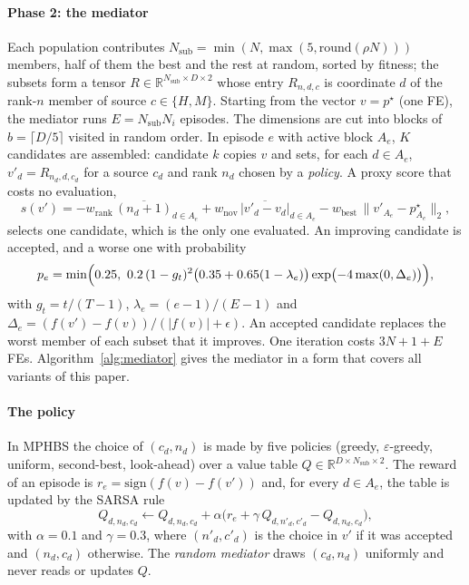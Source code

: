 \paragraph{Phase 2: the mediator} Each population contributes $N_\mathrm{sub}=\min(N,\max(5,\mathrm{round}(\rho N)))$
members, half of them the best and the rest at random, sorted by fitness; the subsets form a tensor
$R\in\mathbb{R}^{N_\mathrm{sub}\times D\times 2}$ whose entry $R_{n,d,c}$ is coordinate $d$ of the rank-$n$ member of source
$c\in\{H,M\}$. Starting from the vector $v=p^\star$ (one FE), the mediator runs $E=N_\mathrm{sub}N_i$ episodes. The
dimensions are cut into blocks of $b=\lceil D/5\rceil$ visited in random order. In episode $e$ with active block $A_e$,
$K$ candidates are assembled: candidate $k$ copies $v$ and sets, for each $d\in A_e$, $v'_d=R_{n_d,d,c_d}$ for a source
$c_d$ and rank $n_d$ chosen by a \emph{policy}. A proxy score that costs no evaluation,
\begin{equation}
s(v') = -w_\mathrm{rank}\,\overline{(n_d+1)}_{d\in A_e} + w_\mathrm{nov}\,\overline{|v'_d-v_d|}_{d\in A_e}
        - w_\mathrm{best}\,\|v'_{A_e}-p^\star_{A_e}\|_2,
\label{eq:proxy}
\end{equation}
selects one candidate, which is the only one evaluated. An improving candidate is accepted, and a worse one with
probability
\begin{equation}
p_e = \min\Bigl(0.25,\ 0.2\,(1-g_t)^2\bigl(0.35+0.65(1-\lambda_e)\bigr)\exp\bigl(-4\max(0,\Delta_e)\bigr)\Bigr),
\label{eq:accept}
\end{equation}
with $g_t=t/(T-1)$, $\lambda_e=(e-1)/(E-1)$ and $\Delta_e=(f(v')-f(v))/(|f(v)|+\epsilon)$. An accepted candidate replaces
the worst member of each subset that it improves. One iteration costs $3N+1+E$ FEs. Algorithm~\ref{alg:mediator} gives
the mediator in a form that covers all variants of this paper.

\paragraph{The policy} In MPHBS the choice of $(c_d,n_d)$ is made by five policies (greedy, $\varepsilon$-greedy,
uniform, second-best, look-ahead) over a value table $Q\in\mathbb{R}^{D\times N_\mathrm{sub}\times 2}$. The reward of an
episode is $r_e=\mathrm{sign}(f(v)-f(v'))$ and, for every $d\in A_e$, the table is updated by the SARSA rule
\begin{equation}
Q_{d,n_d,c_d} \leftarrow Q_{d,n_d,c_d} + \alpha\bigl(r_e + \gamma\,Q_{d,n'_d,c'_d} - Q_{d,n_d,c_d}\bigr),
\label{eq:sarsa}
\end{equation}
with $\alpha=0.1$ and $\gamma=0.3$, where $(n'_d,c'_d)$ is the choice in $v'$ if it was accepted and $(n_d,c_d)$ otherwise.
The \emph{random mediator} draws $(c_d,n_d)$ uniformly and never reads or updates $Q$.

